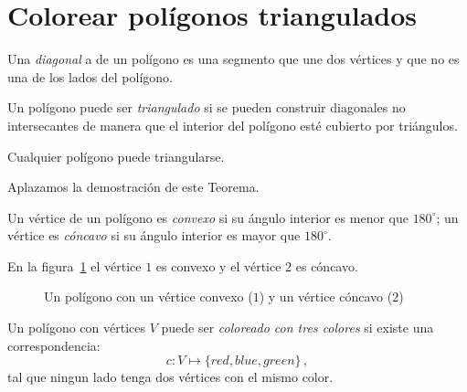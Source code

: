 \section{Colorear polígonos triangulados}\label{s.museum-triangulating}

\begin{definition}
Una \emph{diagonal} a de un polígono es una segmento que une dos vértices y que no es una de los lados del polígono.
\end{definition}

\begin{definition}
Un polígono puede ser \emph{triangulado} si se pueden construir diagonales no intersecantes de manera que el interior del polígono esté cubierto por triángulos.
\end{definition}

\begin{theorem}
Cualquier polígono puede triangularse.\label{thm.tri}
\end{theorem}
Aplazamos la demostración de este Teorema.
\begin{definition}
Un vértice de un polígono es \emph{convexo} si su ángulo interior es menor que $180^\circ$; un vértice es \emph{cóncavo} si su ángulo interior es mayor que $180^\circ$. 
\end{definition}
En la figura~\ref{f.museum.arbitrary} el vértice $1$ es convexo y el vértice $2$ es cóncavo.

\begin{figure}[t]
\begin{center}
\end{center}
\caption{Un polígono con un vértice convexo ($1$) y un vértice cóncavo ($2$)}\label{f.museum.arbitrary}
\end{figure}

\begin{definition}
Un polígono con vértices $V$ puede ser \emph{coloreado con tres colores} si existe una correspondencia:
\[c: V \mapsto \{\mathit{red},\mathit{blue},\mathit{green}\}\,,\]
tal que ningun lado tenga dos vértices con el mismo color.
\end{definition}

